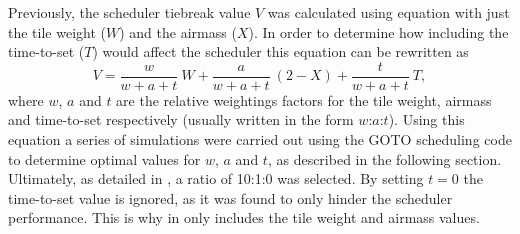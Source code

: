 \begin{colsection}
\begin{colsection}
\newpage

Previously, the scheduler tiebreak value $V$ was calculated using equation  with just the tile weight ($W$) and the airmass ($X$). In order to determine how including the time-to-set ($T$) would affect the scheduler this equation can be rewritten as
%
\begin{equation}
    V = \frac{w}{w+a+t}~W + \frac{a}{w+a+t}~(2-X) + \frac{t}{w+a+t}~T,
    \label{eq:wat}
\end{equation}
%
where $w$, $a$ and $t$ are the relative weightings factors for the tile weight, airmass and time-to-set respectively (usually written in the form $w$:$a$:$t$). Using this equation a series of simulations were carried out using the GOTO scheduling code to determine optimal values for $w$, $a$ and $t$, as described in the following section. Ultimately, as detailed in , a ratio of 10:1:0 was selected. By setting $t=0$ the time-to-set value is ignored, as it was found to only hinder the scheduler performance. This is why  in  only includes the tile weight and airmass values.

\end{colsection}


\end{colsection}


\newpage

